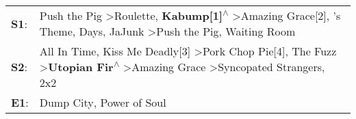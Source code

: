 \begin{supertabular}{p{0.03\textwidth}p{0.92\textwidth}}
 \textbf{S1}:  &  Push the Pig\textsuperscript{} \textgreater \enspace Roulette\textsuperscript{}, \enspace \textbf{Kabump[1]\textsuperscript{$\wedge$}} \textgreater \enspace Amazing Grace[2]\textsuperscript{}, 's Theme\textsuperscript{},  Days\textsuperscript{}, \enspace JaJunk\textsuperscript{} \textgreater \enspace Push the Pig\textsuperscript{}, \enspace Waiting Room\textsuperscript{}  \enspace  \\
 \textbf{S2}:  &            All In Time\textsuperscript{}, \enspace Kiss Me Deadly[3]\textsuperscript{} \textgreater \enspace Pork Chop Pie[4]\textsuperscript{}, \enspace The Fuzz\textsuperscript{} \textgreater \enspace \textbf{Utopian Fir\textsuperscript{$\wedge$}} \textgreater \enspace Amazing Grace\textsuperscript{} \textgreater \enspace Syncopated Strangers\textsuperscript{}, \enspace 2x2\textsuperscript{}  \enspace  \\
 \textbf{E1}:  &                                                                                                                                                                                                                                                                                                                                        Dump City\textsuperscript{}, \enspace Power of Soul\textsuperscript{}  \enspace  \\
\end{supertabular}
